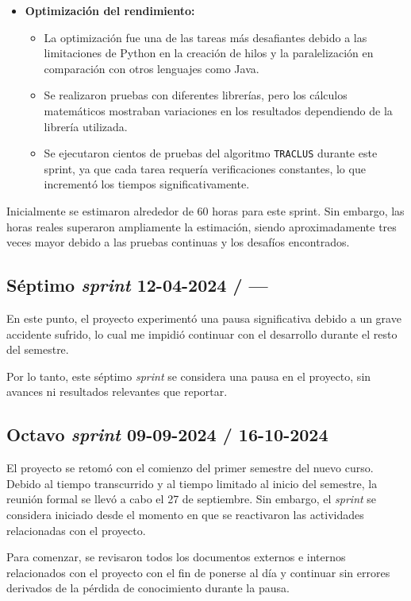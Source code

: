 \begin{itemize}
    \item \textbf{Optimización del rendimiento:}
        \begin{itemize}
            \item La optimización fue una de las tareas más desafiantes debido a las limitaciones de Python en la creación de hilos y la paralelización en comparación con otros lenguajes como Java.
            \item Se realizaron pruebas con diferentes librerías, pero los cálculos matemáticos mostraban variaciones en los resultados dependiendo de la librería utilizada.
            \item Se ejecutaron cientos de pruebas del algoritmo \texttt{TRACLUS} durante este sprint, ya que cada tarea requería verificaciones constantes, lo que incrementó los tiempos significativamente.
        \end{itemize}
\end{itemize}  
     
Inicialmente se estimaron alrededor de 60 horas para este sprint. Sin embargo, las horas reales superaron ampliamente la estimación, siendo aproximadamente tres veces mayor debido a las pruebas continuas y los desafíos encontrados.

\subsection{Séptimo \textit{sprint} 12-04-2024 / ---}

En este punto, el proyecto experimentó una pausa significativa debido a un grave accidente sufrido, lo cual me impidió continuar con el desarrollo durante el resto del semestre. 

Por lo tanto, este séptimo \textit{sprint} se considera una pausa en el proyecto, sin avances ni resultados relevantes que reportar.

\subsection{Octavo \textit{sprint} 09-09-2024 / 16-10-2024}

El proyecto se retomó con el comienzo del primer semestre del nuevo curso. Debido al tiempo transcurrido y al tiempo limitado al inicio del semestre, la reunión formal se llevó a cabo el 27 de septiembre. Sin embargo, el \textit{sprint} se considera iniciado desde el momento en que se reactivaron las actividades relacionadas con el proyecto.

Para comenzar, se revisaron todos los documentos externos e internos relacionados con el proyecto con el fin de ponerse al día y continuar sin errores derivados de la pérdida de conocimiento durante la pausa.

